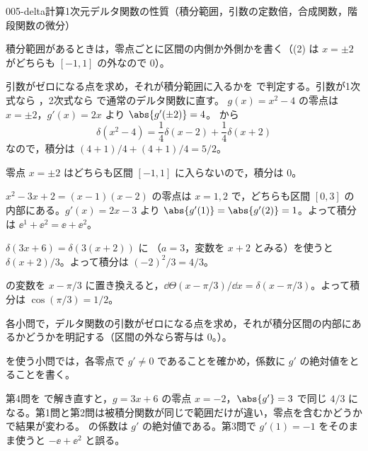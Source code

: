 \documentclass[uplatex,dvipdfmx,a4paper,11pt]{jsarticle}
\begin{document}
\begin{mondai}{005-delta}{計算}{1次元デルタ関数の性質（積分範囲，引数の定数倍，合成関数，階段関数の微分）}
\begin{kizuki}
\item 積分範囲があるときは，零点ごとに区間の内側か外側かを書く（(2) は $x=\pm2$ がどちらも $[-1,1]$ の外なので $0$）。
\end{kizuki}
\begin{tadashii}
\houshin 引数がゼロになる点を求め，それが積分範囲に入るかを  で判定する。引数が1次式なら ，2次式なら  で通常のデルタ関数に直す。
\keisan {} $g(x) = x^2 - 4$ の零点は $x = \pm 2$，$g'(x) = 2x$ より $\abs{g'(\pm 2)} = 4$。 から
\[ \delta(x^2 - 4) = \frac{1}{4}\delta(x - 2) + \frac{1}{4}\delta(x + 2) \]
なので，積分は $(4 + 1)/4 + (4 + 1)/4 = 5/2$。

 零点 $x = \pm 2$ はどちらも区間 $[-1, 1]$ に入らないので，積分は $0$。

 $x^2 - 3x + 2 = (x - 1)(x - 2)$ の零点は $x = 1, 2$ で，どちらも区間 $[0, 3]$ の内部にある。$g'(x) = 2x - 3$ より $\abs{g'(1)} = \abs{g'(2)} = 1$。よって積分は $\ee^{1} + \ee^{2} = \ee + \ee^2$。

 $\delta(3x + 6) = \delta(3(x + 2))$ に （$a = 3$，変数を $x + 2$ とみる）を使うと $\delta(x + 2)/3$。よって積分は $(-2)^2/3 = 4/3$。

  の変数を $x - \pi/3$ に置き換えると，$\dd\Theta(x - \pi/3)/\dd x = \delta(x - \pi/3)$。よって積分は $\cos(\pi/3) = 1/2$。
\begin{ronten}
  \item 各小問で，デルタ関数の引数がゼロになる点を求め，それが積分区間の内部にあるかどうかを明記する（区間の外なら寄与は $0$。）。
  \item {} を使う小問では，各零点で $g'\neq0$ であることを確かめ，係数に $g'$ の絶対値をとることを書く。
\end{ronten}
\kenzan 第4問を  で解き直すと，$g = 3x + 6$ の零点 $x = -2$，$\abs{g'} = 3$ で同じ $4/3$ になる。第1問と第2問は被積分関数が同じで範囲だけが違い，零点を含むかどうかで結果が変わる。
\tsumazuki {} の係数は $g'$ の絶対値である。第3問で $g'(1) = -1$ をそのまま使うと $-\ee + \ee^2$ と誤る。
\end{tadashii}
\end{mondai}
\end{document}
